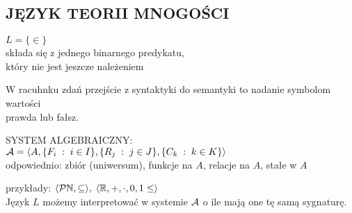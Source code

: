 \documentclass{article}
\begin{document}
\subsection{JĘZYK TEORII MNOGOŚCI}
\begin{center}\large
    {\color{def}$L=\{\in\}$}\smallskip\\
    składa się z jednego binarnego predykatu, \\który nie jest jeszcze należeniem
\end{center}\bigskip
W racuhnku zdań przejście z syntaktyki do semantyki to nadanie symbolom wartości \\prawda lub fałsz.\bigskip
\begin{center}\large
    {\color{def}SYSTEM ALGEBRAICZNY:}\smallskip\\
    {\color{emp}$\mathcal{A}=\langle A,\{F_i\;:\;i\in I\},\{R_j\;:\;j\in J\},\{C_k\;:\;k\in K\}\rangle$}\smallskip\\
    {\normalsize odpowiednio: zbiór (uniwersum), funkcje na $A$, relacje na $A$, stałe w $A$}
\end{center}\medskip
przykłady: $\langle \mathcal{P}\mathbb{N},\subseteq\rangle, \;\langle \mathbb{R}, +, \cdot, 0, 1\leq\rangle$\bigskip\\
Język $L$ możemy interpretować w systemie $\mathcal{A}$ o ile mają one tę samą sygnaturę.\bigskip
\begin{center}
\end{center}
\end{document}
